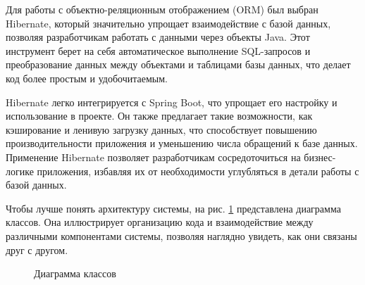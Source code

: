 \documentclass[14pt]{extarticle} %
\begin{document}

Для работы с объектно-реляционным отображением (ORM) был выбран Hibernate, который значительно упрощает взаимодействие с базой данных, позволяя разработчикам работать с данными через объекты Java. Этот инструмент берет на себя автоматическое выполнение SQL-запросов и преобразование данных между объектами и таблицами базы данных, что делает код более простым и удобочитаемым.

Hibernate легко интегрируется с Spring Boot, что упрощает его настройку и использование в проекте. Он также предлагает такие возможности, как кэширование и ленивую загрузку данных, что способствует повышению производительности приложения и уменьшению числа обращений к базе данных. Применение Hibernate позволяет разработчикам сосредоточиться на бизнес-логике приложения, избавляя их от необходимости углубляться в детали работы с базой данных.

 

Чтобы лучше понять архитектуру системы, на рис. \ref{model} представлена диаграмма классов. Она иллюстрирует организацию кода и взаимодействие между различными компонентами системы, позволяя наглядно увидеть, как они связаны друг с другом.

\begin{figure}[h]
\centering
{}
\caption{Диаграмма классов}
\label{model}
\end{figure}
\end{document}
